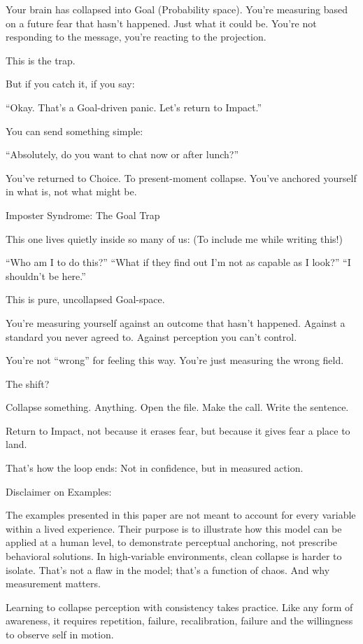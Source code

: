 \documentclass[12pt]{article}
\begin{document}
Your brain has collapsed into Goal (Probability space).
You're measuring based on a future fear that hasn’t happened. Just what it could be. 
You’re not responding to the message, you’re reacting to the projection.

This is the trap.

But if you catch it, if you say:

“Okay. That’s a Goal-driven panic. Let’s return to Impact.”

You can send something simple:

“Absolutely, do you want to chat now or after lunch?”

You’ve returned to Choice. To present-moment collapse.
You’ve anchored yourself in what is, not what might be.

Imposter Syndrome: The Goal Trap

This one lives quietly inside so many of us: (To include me while writing this!)

“Who am I to do this?”
“What if they find out I’m not as capable as I look?”
“I shouldn’t be here.”

This is pure, uncollapsed Goal-space.

You’re measuring yourself against an outcome that hasn’t happened.
Against a standard you never agreed to.
Against perception you can’t control.

You’re not “wrong” for feeling this way.
You’re just measuring the wrong field.

The shift?

Collapse something. Anything.
Open the file. Make the call. Write the sentence.

Return to Impact, not because it erases fear, but because it gives fear a place to land.

That’s how the loop ends:
Not in confidence, but in measured action.

Disclaimer on Examples:

The examples presented in this paper are not meant to account for every variable within a lived experience. Their purpose is to illustrate how this model can be applied at a human level, to demonstrate perceptual anchoring, not prescribe behavioral solutions. In high-variable environments, clean collapse is harder to isolate. That’s not a flaw in the model; that’s a function of chaos. And why measurement matters.

Learning to collapse perception with consistency takes practice. Like any form of awareness, it requires repetition, failure, recalibration, failure and the willingness to observe self in motion.
\end{document}
